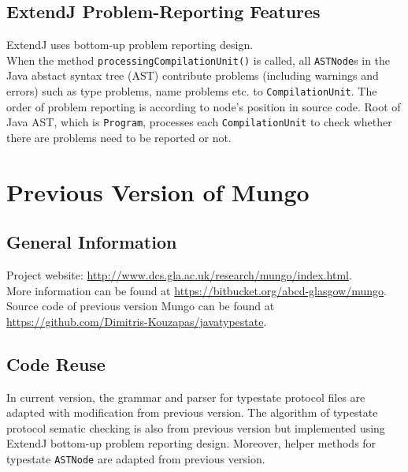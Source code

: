 \documentclass[]{article}
\begin{document}
\subsection{ExtendJ Problem-Reporting Features}
ExtendJ uses bottom-up problem reporting design. \\[0.2cm]
When the method \texttt{processingCompilationUnit()} is called, all \texttt{ASTNode}s in the Java abstact syntax tree (AST) contribute problems (including warnings and errors) such as type problems, name problems etc. to \texttt{CompilationUnit}. The order of problem reporting is according to node's position in source code. Root of Java AST, which is \texttt{Program}, processes each \texttt{CompilationUnit} to check whether there are problems need to be reported or not.

\section{Previous Version of Mungo}
\subsection{General Information}
Project website: \url{http://www.dcs.gla.ac.uk/research/mungo/index.html}. \\[0.2cm]
More information can be found at \url{https://bitbucket.org/abcd-glasgow/mungo}. \\[0.2cm]
Source code of previous version Mungo can be found at \url{https://github.com/Dimitris-Kouzapas/javatypestate}.

\subsection{Code Reuse}
In current version, the grammar and parser for typestate protocol files are adapted with modification from previous version. The algorithm of typestate protocol sematic checking is also from previous version but implemented using ExtendJ bottom-up problem reporting design. Moreover, helper methods for typestate \texttt{ASTNode} are adapted from previous version.
\end{document}
